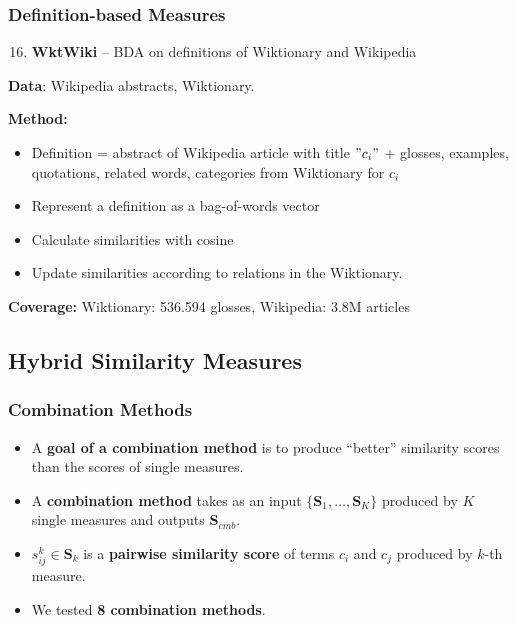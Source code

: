\documentclass{beamer}
\begin{document}
\begin{frame}
\frametitle{Definition-based Measures}

\begin{enumerate}
 \setcounter{enumi}{15} 
\item \textbf{WktWiki} -- BDA on definitions of Wiktionary and Wikipedia%

\end{enumerate}

\textbf{Data}: Wikipedia abstracts, Wiktionary.

\textbf{Method:}
\begin{itemize}
  \item Definition = abstract of Wikipedia article with title $"c_i"$ + 
   glosses, examples, quotations, related words, categories from Wiktionary  for $c_i$
   \item Represent a definition as a bag-of-words vector
   \item Calculate similarities with cosine
   \item Update similarities according to relations in the Wiktionary.
  
\end{itemize}
   \textbf{Coverage:} Wiktionary: 536.594 glosses, Wikipedia: 3.8M articles
   
\end{frame}


\subsection{Hybrid Similarity Measures}

\begin{frame}
\frametitle{Combination Methods}
\begin{itemize}
\item A \textbf{goal of a combination method} is to produce ``better'' similarity scores than the
scores of single measures.

\item A \textbf{combination method} takes as an input   
$\{\mathbf{S}_1,\ldots,\mathbf{S}_K\}$ produced by $K$ single measures and
outputs  $\mathbf{S}_{cmb}$.

\item $s_{ij}^k \in \mathbf{S}_k$ is a \textbf{pairwise similarity score} of terms $c_i$ and $c_j$ produced by $k$-th measure.

\item We tested \textbf{8  combination methods}.

\end{itemize}
\end{frame}
\end{document}
